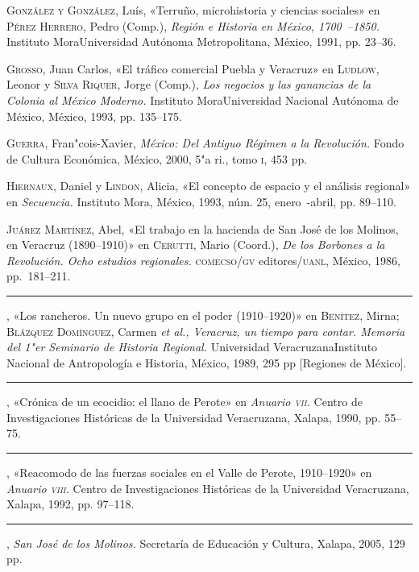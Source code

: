 \documentclass[14pt,twoside,final]{extbook} %
\begin{document}
\textsc{González y González}, Luís, «Terruño, microhistoria y ciencias sociales» en \textsc{Pérez Herrero}, Pedro (Comp.), \emph{Región e Historia en México, 1700~--1850.} Instituto Mora Universidad Autónoma Metropolitana, México, 1991, pp. 23--36.

\textsc{Grosso}, Juan Carlos, «El tráfico comercial Puebla y Veracruz» en \textsc{Ludlow}, Leonor y \textsc{Silva Riquer}, Jorge (Comp.), \emph{Los negocios y las ganancias de la Colonia al México Moderno.} Instituto Mora Universidad Nacional Autónoma de México, México, 1993, pp. 135--175.

\textsc{Guerra}, Fran"cois-Xavier, \emph{México: Del Antiguo Régimen a la Revolución.} Fondo de Cultura Económica, México, 2000, 5"a ri., tomo \textsc{i}, 453 pp.

\textsc{Hiernaux}, Daniel y \textsc{Lindon}, Alicia, «El concepto de espacio y el análisis regional» en \textit{Secuencia.} Instituto Mora, México, 1993, núm. 25, enero~-abril, pp. 89--110.

\textsc{Juárez Martínez}, Abel, «El trabajo en la hacienda de San José de los Molinos, en Veracruz (1890--1910)» en \textsc{Cerutti}, Mario (Coord.), \emph{De los Borbones a la Revolución. Ocho estudios regionales.} \textsc{comecso/gv} editores/\textsc{uanl}, México, 1986, pp.~181--211.

\rule{1cm}{0.4pt}, «Los rancheros. Un nuevo grupo en el poder (1910--1920)» en \textsc{Benítez}, Mirna; \textsc{Blázquez Domínguez}, Carmen \emph{et al., Veracruz, un tiempo para contar. Memoria del 1"er Seminario de Historia Regional.} Universidad Veracruzana Instituto Nacional de Antropología e Historia, México, 1989, 295 pp [Regiones de México].

\rule{1cm}{0.4pt}, «Crónica de un ecocidio: el llano de Perote» en \textit{Anuario \textsc{vii}.} Centro de Investigaciones Históricas de la Universidad Veracruzana, Xalapa, 1990, pp. 55--75.

\rule{1cm}{0.4pt}, «Reacomodo de las fuerzas sociales en el Valle de Perote, 1910--1920» en \textit{Anuario \textsc{viii}.} Centro de Investigaciones Históricas de la Universidad Veracruzana, Xalapa, 1992, pp. 97--118.

\rule{1cm}{0.4pt}, \emph{San José de los Molinos.} Secretaría de Educación y Cultura, Xalapa, 2005, 129 pp.
\end{document}
